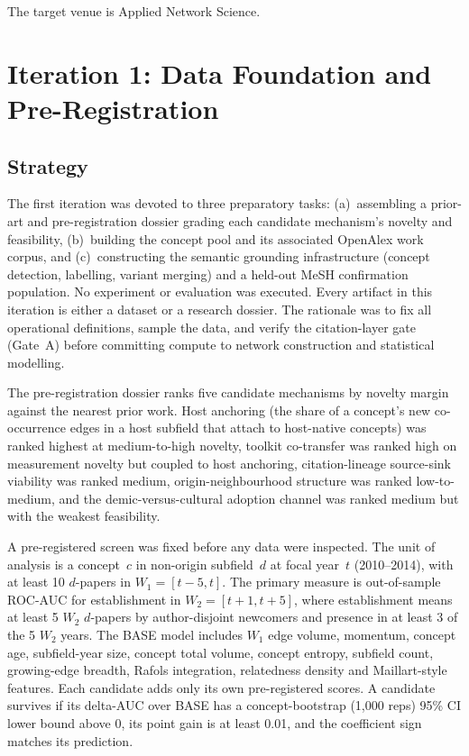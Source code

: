 \documentclass[11pt,letterpaper]{article}
\begin{document}
The target venue is Applied Network Science.

\section{Iteration 1: Data Foundation and Pre-Registration}
\label{sec:iter1}

\subsection{Strategy}

The first iteration was devoted to three preparatory tasks: (a)~assembling a prior-art and pre-registration dossier grading each candidate mechanism's novelty and feasibility, (b)~building the concept pool and its associated OpenAlex work corpus, and (c)~constructing the semantic grounding infrastructure (concept detection, labelling, variant merging) and a held-out MeSH confirmation population.
No experiment or evaluation was executed.
Every artifact in this iteration is either a dataset or a research dossier.
The rationale was to fix all operational definitions, sample the data, and verify the citation-layer gate (Gate~A) before committing compute to network construction and statistical modelling.

The pre-registration dossier ranks five candidate mechanisms by novelty margin against the nearest prior work.
Host anchoring (the share of a concept's new co-occurrence edges in a host subfield that attach to host-native concepts) was ranked highest at medium-to-high novelty, toolkit co-transfer was ranked high on measurement novelty but coupled to host anchoring, citation-lineage source-sink viability was ranked medium, origin-neighbourhood structure was ranked low-to-medium, and the demic-versus-cultural adoption channel was ranked medium but with the weakest feasibility.

A pre-registered screen was fixed before any data were inspected.
The unit of analysis is a concept~$c$ in non-origin subfield~$d$ at focal year~$t$ (2010--2014), with at least 10 $d$-papers in $W_1 = [t-5, t]$.
The primary measure is out-of-sample ROC-AUC for establishment in $W_2 = [t+1, t+5]$, where establishment means at least 5 $W_2$ $d$-papers by author-disjoint newcomers and presence in at least 3 of the 5 $W_2$ years.
The BASE model includes $W_1$ edge volume, momentum, concept age, subfield-year size, concept total volume, concept entropy, subfield count, growing-edge breadth, Rafols integration, relatedness density and Maillart-style features.
Each candidate adds only its own pre-registered scores.
A candidate survives if its delta-AUC over BASE has a concept-bootstrap (1,000 reps) 95\% CI lower bound above 0, its point gain is at least 0.01, and the coefficient sign matches its prediction.
\end{document}
